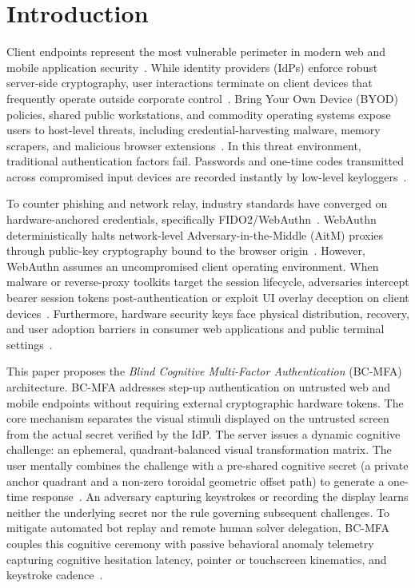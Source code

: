\section{Introduction}
\label{sec:introduction}

Client endpoints represent the most vulnerable perimeter in modern web and mobile application security~\cite{syed2022zero}. While identity providers (IdPs) enforce robust server-side cryptography, user interactions terminate on client devices that frequently operate outside corporate control~\cite{jannett2024sok}. Bring Your Own Device (BYOD) policies, shared public workstations, and commodity operating systems expose users to host-level threats, including credential-harvesting malware, memory scrapers, and malicious browser extensions~\cite{gautam2025passwords, lee2024beneath}. In this threat environment, traditional authentication factors fail. Passwords and one-time codes transmitted across compromised input devices are recorded instantly by low-level keyloggers~\cite{amft2023weve}.

To counter phishing and network relay, industry standards have converged on hardware-anchored credentials, specifically FIDO2/WebAuthn~\cite{angelogianni2024how, nist80063b4}. WebAuthn deterministically halts network-level Adversary-in-the-Middle (AitM) proxies through public-key cryptography bound to the browser origin~\cite{golaszewski2026binding}. However, WebAuthn assumes an uncompromised client operating environment. When malware or reverse-proxy toolkits target the session lifecycle, adversaries intercept bearer session tokens post-authentication or exploit UI overlay deception on client devices~\cite{mahdad2024breaching, hilbig2023protect, lim2025phishers}. Furthermore, hardware security keys face physical distribution, recovery, and user adoption barriers in consumer web applications and public terminal settings~\cite{kepkowski2023challenges}.

This paper proposes the \textit{Blind Cognitive Multi-Factor Authentication} (BC-MFA) architecture. BC-MFA addresses step-up authentication on untrusted web and mobile endpoints without requiring external cryptographic hardware tokens. The core mechanism separates the visual stimuli displayed on the untrusted screen from the actual secret verified by the IdP. The server issues a dynamic cognitive challenge: an ephemeral, quadrant-balanced visual transformation matrix. The user mentally combines the challenge with a pre-shared cognitive secret (a private anchor quadrant and a non-zero toroidal geometric offset path) to generate a one-time response~\cite{binbeshr2025challenge}. An adversary capturing keystrokes or recording the display learns neither the underlying secret nor the rule governing subsequent challenges. To mitigate automated bot replay and remote human solver delegation, BC-MFA couples this cognitive ceremony with passive behavioral anomaly telemetry capturing cognitive hesitation latency, pointer or touchscreen kinematics, and keystroke cadence~\cite{incel2021dakota, khan2024mouse}.

